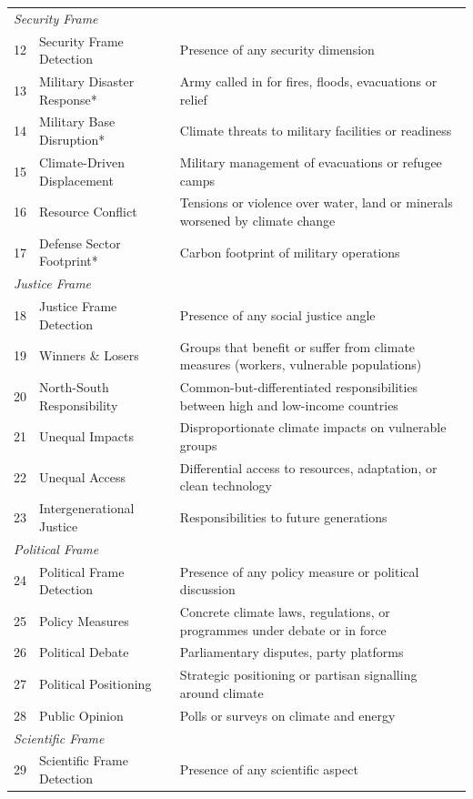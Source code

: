 {\begin{longtable}{p{0.5cm}p{5cm}p{16cm}}
\midrule
\multicolumn{3}{l}{\textit{Security Frame}} \\
12 & Security Frame Detection & Presence of any security dimension \\
13 & Military Disaster Response* & Army called in for fires, floods, evacuations or relief \\
14 & Military Base Disruption* & Climate threats to military facilities or readiness \\
15 & Climate-Driven Displacement & Military management of evacuations or refugee camps \\
16 & Resource Conflict & Tensions or violence over water, land or minerals worsened by climate change \\
17 & Defense Sector Footprint* & Carbon footprint of military operations \\
\midrule
\multicolumn{3}{l}{\textit{Justice Frame}} \\
18 & Justice Frame Detection & Presence of any social justice angle \\
19 & Winners \& Losers & Groups that benefit or suffer from climate measures (workers, vulnerable populations) \\
20 & North-South Responsibility & Common-but-differentiated responsibilities between high and low-income countries \\
21 & Unequal Impacts & Disproportionate climate impacts on vulnerable groups \\
22 & Unequal Access & Differential access to resources, adaptation, or clean technology \\
23 & Intergenerational Justice & Responsibilities to future generations \\
\midrule
\multicolumn{3}{l}{\textit{Political Frame}} \\
24 & Political Frame Detection & Presence of any policy measure or political discussion \\
25 & Policy Measures & Concrete climate laws, regulations, or programmes under debate or in force \\
26 & Political Debate & Parliamentary disputes, party platforms \\
27 & Political Positioning & Strategic positioning or partisan signalling around climate \\
28 & Public Opinion & Polls or surveys on climate and energy \\
\midrule
\multicolumn{3}{l}{\textit{Scientific Frame}} \\
29 & Scientific Frame Detection & Presence of any scientific aspect \\

\end{longtable}}
